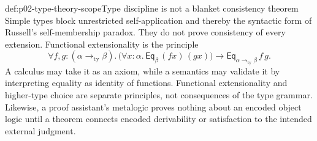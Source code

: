 \begin{hbwarning}{def:p02-type-theory-scope}{Type discipline is not a blanket consistency theorem}
Simple types block unrestricted self-application and thereby the syntactic
form of Russell's self-membership paradox.  They do not prove consistency of
every extension.  Functional extensionality is the principle
\[
 \forall f,g{:}(\alpha\mathbin{\to_{\mathrm{ty}}}\beta).\,
 \bigl(\forall x{:}\alpha.\,\mathsf{Eq}_{\beta}\,(fx)\,(gx)\bigr)\to
 \mathsf{Eq}_{\alpha\mathbin{\to_{\mathrm{ty}}}\beta}\,f\,g.
\]
A calculus may take it as an axiom, while a semantics may validate it by
interpreting equality as identity of functions.  Functional extensionality
and higher-type choice are separate principles, not consequences of the type
grammar.  Likewise, a proof assistant's metalogic proves nothing about an
encoded object logic until a theorem connects encoded derivability or
satisfaction to the intended external judgment.
\end{hbwarning}

